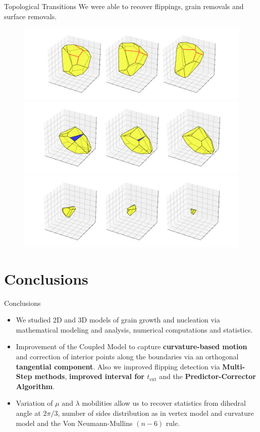 \documentclass[usenames,dvipsnames]{beamer}
\begin{document}
\begin{frame}{Topological Transitions}
We were able to recover flippings, grain removals and surface removals.
\vspace{-0.2em}
\begin{figure}
    \centering
    \includegraphics[scale=0.2]{figures/3d_voronoi/3D_flipping.pdf}\\
    \includegraphics[scale=0.2]{figures/3d_voronoi/3D_surface_removal.pdf}\\
    \includegraphics[scale=0.2]{figures/3d_voronoi/3D_grain_removal.pdf}
\end{figure}
\end{frame}

\section{Conclusions}
\begin{frame}{Conclusions}
\begin{itemize}
    \item We studied 2D and 3D models of grain growth and nucleation via mathematical modeling and analysis, numerical computations and statistics.
    \item Improvement of the Coupled Model to capture \textbf{curvature-based motion} and correction of interior points along the boundaries via an orthogonal \textbf{tangential component}. Also we improved flipping detection via \textbf{Multi-Step methods}, \textbf{improved interval for $t_{\text{ext}}$} and the \textbf{Predictor-Corrector Algorithm}.
    \item Variation of $\mu$ and $\lambda$ mobilities allow us to recover statistics from dihedral angle at $2\pi/3$, number of sides distribution as in vertex model and curvature model and the Von Neumann-Mullins $(n-6)$ rule.
\end{itemize}
\end{frame}
\end{document}
